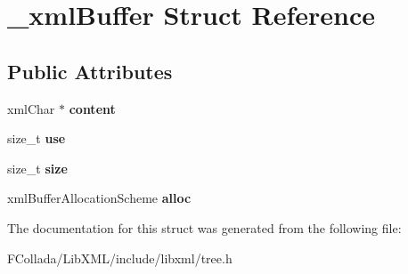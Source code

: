 \hypertarget{struct__xmlBuffer}{
\section{\_\-xmlBuffer Struct Reference}
\label{struct__xmlBuffer}
}
\subsection*{Public Attributes}
\begin{DoxyCompactItemize}
\item 
\hypertarget{struct__xmlBuffer_aec9312296378e1d503fce977e45e40bb}{
xmlChar $\ast$ {\bfseries content}}
\label{struct__xmlBuffer_aec9312296378e1d503fce977e45e40bb}

\item 
\hypertarget{struct__xmlBuffer_a05234bc369eca9437299ab1ac2c3ced5}{
size\_\-t {\bfseries use}}
\label{struct__xmlBuffer_a05234bc369eca9437299ab1ac2c3ced5}

\item 
\hypertarget{struct__xmlBuffer_a4bc078d249894b4ef19058fc643a4af1}{
size\_\-t {\bfseries size}}
\label{struct__xmlBuffer_a4bc078d249894b4ef19058fc643a4af1}

\item 
\hypertarget{struct__xmlBuffer_acac8aee322443ed7a9d0854ee5a87b02}{
xmlBufferAllocationScheme {\bfseries alloc}}
\label{struct__xmlBuffer_acac8aee322443ed7a9d0854ee5a87b02}

\end{DoxyCompactItemize}


The documentation for this struct was generated from the following file:\begin{DoxyCompactItemize}
\item 
FCollada/LibXML/include/libxml/tree.h\end{DoxyCompactItemize}

